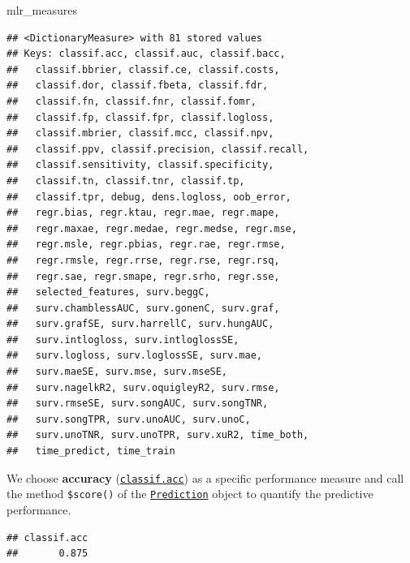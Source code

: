 \documentclass[]{article}
\newenvironment{Shaded}{\begin{snugshade}}{\end{snugshade}}
\newcommand{\KeywordTok}[1]{\textcolor[rgb]{0.13,0.29,0.53}{\textbf{#1}}}
\newcommand{\NormalTok}[1]{#1}
\newcommand{\OperatorTok}[1]{\textcolor[rgb]{0.81,0.36,0.00}{\textbf{#1}}}
\newcommand{\StringTok}[1]{\textcolor[rgb]{0.31,0.60,0.02}{#1}}
\renewenvironment{Shaded} {\begin{snugshade}\small} {\end{snugshade}}
\begin{document}
\begin{Shaded}
\begin{Highlighting}[]
\NormalTok{mlr_measures}
\end{Highlighting}
\end{Shaded}

\begin{verbatim}
## <DictionaryMeasure> with 81 stored values
## Keys: classif.acc, classif.auc, classif.bacc,
##   classif.bbrier, classif.ce, classif.costs,
##   classif.dor, classif.fbeta, classif.fdr,
##   classif.fn, classif.fnr, classif.fomr,
##   classif.fp, classif.fpr, classif.logloss,
##   classif.mbrier, classif.mcc, classif.npv,
##   classif.ppv, classif.precision, classif.recall,
##   classif.sensitivity, classif.specificity,
##   classif.tn, classif.tnr, classif.tp,
##   classif.tpr, debug, dens.logloss, oob_error,
##   regr.bias, regr.ktau, regr.mae, regr.mape,
##   regr.maxae, regr.medae, regr.medse, regr.mse,
##   regr.msle, regr.pbias, regr.rae, regr.rmse,
##   regr.rmsle, regr.rrse, regr.rse, regr.rsq,
##   regr.sae, regr.smape, regr.srho, regr.sse,
##   selected_features, surv.beggC,
##   surv.chamblessAUC, surv.gonenC, surv.graf,
##   surv.grafSE, surv.harrellC, surv.hungAUC,
##   surv.intlogloss, surv.intloglossSE,
##   surv.logloss, surv.loglossSE, surv.mae,
##   surv.maeSE, surv.mse, surv.mseSE,
##   surv.nagelkR2, surv.oquigleyR2, surv.rmse,
##   surv.rmseSE, surv.songAUC, surv.songTNR,
##   surv.songTPR, surv.unoAUC, surv.unoC,
##   surv.unoTNR, surv.unoTPR, surv.xuR2, time_both,
##   time_predict, time_train
\end{verbatim}

We choose \textbf{accuracy} (\href{https://mlr3.mlr-org.com/reference/mlr_measures_classif.acc.html}{\texttt{classif.acc}}) as a specific performance measure and call the method \texttt{\$score()} of the \href{https://mlr3.mlr-org.com/reference/Prediction.html}{\texttt{Prediction}} object to quantify the predictive performance.

\begin{Shaded}
\end{Shaded}

\begin{verbatim}
## classif.acc 
##       0.875
\end{verbatim}
\end{document}
